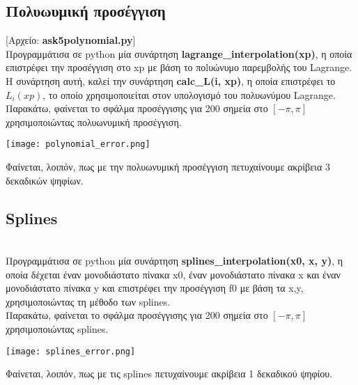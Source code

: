 \documentclass{article}
\newcommand{\lt}{\latintext}
\newcommand{\gt}{\greektext}
\begin{document}
\subsection{Πολυωυμική προσέγγιση}
[Αρχείο: \lt \textbf{ask5polynomial.py}] \gt \\
Προγραμμάτισα σε \lt python \gt μία συνάρτηση \lt \textbf{lagrange{\_}interpolation(xp)}, \gt η οποία επιστρέφει την προσέγγιση στο \lt xp \gt με βάση το ποlυώνυμο παρεμβολής του \lt Lagrange. \gt Η συνάρτηση αυτή, καλεί την συνάρτηση \lt \textbf{calc{\_}L(i, xp)}, \gt η οποία επιστρέφει το $L_i(xp)$, το οποίο χρησιμοποιείται στον υπολογισμό του πολυωνύμου \lt Lagrange. \gt \\
Παρακάτω, φαίνεται το σφάλμα προσέγγισης για 200 σημεία στο $[-\pi,\pi]$ χρησιμοποιώντας πολυωνυμική προσέγγιση.
\begin{center}
\texttt{[image: polynomial\_error.png]}
\end{center}
Φαίνεται, λοιπόν, πως με την πολυωνυμική προσέγγιση πετυχαίνουμε ακρίβεια 3 δεκαδικών ψηφίων.

\lt
\subsection{Splines}
\gt
[Αρχείο: \lt \textbf{ask5splines.py}] \gt \\
Προγραμμάτισα σε \lt python \gt μία συνάρτηση \lt \textbf{splines{\_}interpolation(x0, x, y)}, \gt η οποία δέχεται έναν μονοδιάστατο πίνακα \lt x0, \gt έναν μονοδιάστατο πίνακα \lt x \gt και έναν μονοδιάστατο πίνακα \lt y \gt και επιστρέφει την προσέγγιση \lt f0 \gt  με βάση τα \lt x,y, \gt χρησιμοποιώντας τη μέθοδο των \lt splines. \gt \\
Παρακάτω, φαίνεται το σφάλμα προσέγγισης για 200 σημεία στο $[-\pi,\pi]$ χρησιμοποιώντας \lt splines. \gt
\begin{center}
\texttt{[image: splines\_error.png]}
\end{center}
Φαίνεται, λοιπόν, πως με τις \lt splines \gt πετυχαίνουμε ακρίβεια 1 δεκαδικού ψηφίου.
\end{document}
